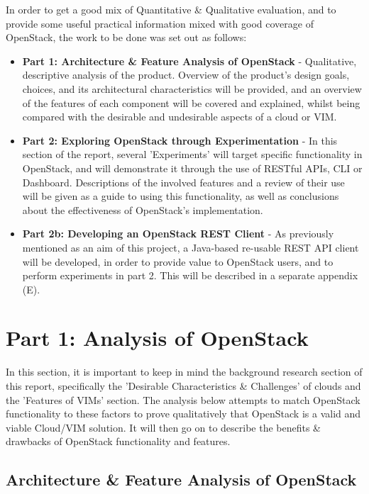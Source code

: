 In order to get a good mix of Quantitative \& Qualitative evaluation, and to provide some useful practical information mixed with good coverage of OpenStack, the work to be done was set out as follows: 

\begin{itemize}
\item \textbf{Part 1: Architecture \& Feature Analysis of OpenStack} - Qualitative, descriptive analysis of the product. Overview of the product's design goals, choices, and its architectural characteristics will be provided, and an overview of the features of each component will be covered and explained, whilst being compared with the desirable and undesirable aspects of a cloud or VIM. 

\item \textbf{Part 2: Exploring OpenStack through Experimentation} - In this section of the report, several 'Experiments' will target specific functionality in OpenStack, and will demonstrate it through the use of RESTful APIs, CLI or Dashboard. Descriptions of the involved features and a review of their use will be given as a guide to using this functionality, as well as conclusions about the effectiveness of OpenStack's implementation. 

\item \textbf{Part 2b: Developing an OpenStack REST Client} - As previously mentioned as an aim of this project, a Java-based re-usable REST API client will be developed, in order to provide value to OpenStack users, and to perform experiments in part 2. This will be described in a separate appendix (E).
\end{itemize}

\section{Part 1: Analysis of OpenStack}

In this section, it is important to keep in mind the background research section of this report, specifically the 'Desirable Characteristics \& Challenges' of clouds and the 'Features of VIMs' section. The analysis below attempts to match OpenStack functionality to these factors to prove qualitatively that OpenStack is a valid and viable Cloud/VIM solution.  It will then go on to describe the benefits \& drawbacks of OpenStack functionality and features. 

\subsection{Architecture \& Feature Analysis of OpenStack}

